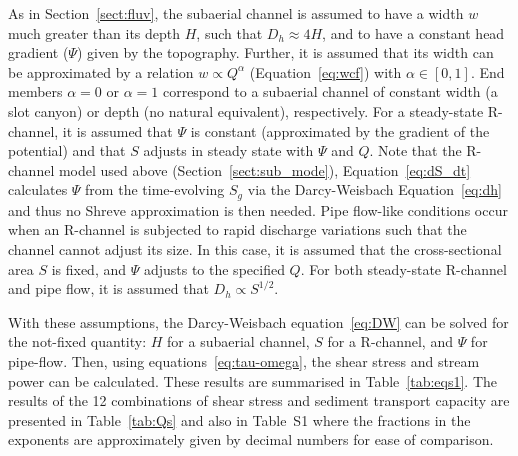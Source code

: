 \documentclass[tc, manuscript]{copernicus}
\begin{document}
As in Section~\ref{sect:fluv}, the subaerial channel is assumed to have a width $w$ much greater than its depth $H$, such that $D_h\approx 4H$, and to have a constant head gradient ($\Psi$) given by the topography.
Further, it is assumed that its width can be approximated by a relation $w \propto Q^\alpha$ (Equation~\ref{eq:wcf}) with $\alpha\in [0,1]$.
End members $\alpha=0$ or $\alpha=1$ correspond to a subaerial channel of constant width (a slot canyon) or depth (no natural equivalent), respectively.
% 
For a steady-state R-channel, it is assumed that  $\Psi$ is constant (approximated by the gradient of the \citet{shreve1972} potential) and that $S$ adjusts in steady state with $\Psi$ and $Q$.
Note that the R-channel model used above (Section~\ref{sect:sub_mode}), Equation~\ref{eq:dS_dt} calculates $\Psi$ from the time-evolving $S_g$ via the Darcy-Weisbach Equation~\ref{eq:dh} and thus no Shreve approximation is then needed.
% 
Pipe flow-like conditions occur when an R-channel is subjected to rapid discharge variations such that the channel cannot adjust its size.
In this case, it is assumed that the cross-sectional area $S$ is fixed, and $\Psi$ adjusts to the specified $Q$.
For both steady-state R-channel and pipe flow, it is assumed that $D_h \propto S^{1/2}$.

With these assumptions, the Darcy-Weisbach equation~\eqref{eq:DW} can be solved for the not-fixed quantity: $H$ for a subaerial channel, $S$ for a R-channel, and $\Psi$ for pipe-flow.
Then, using equations~\eqref{eq:tau-omega}, the shear stress and stream power can be calculated.
These results are summarised in Table~\ref{tab:eqs1}.
The results of the 12 combinations of shear stress and sediment transport capacity are presented in Table~\ref{tab:Qs} and also in Table~S1 where the fractions in the exponents are approximately given by decimal numbers for ease of comparison.
\end{document}
